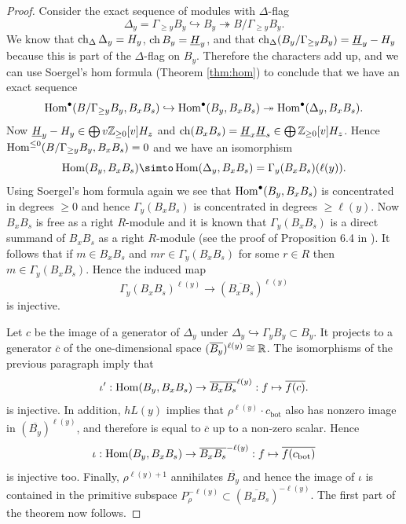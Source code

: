 \documentclass[11pt]{amsart}
\numberwithin{equation}{section}
\def\bot{{\mathrm{bot}}}
\def\ov{\overline}
\def\un{\underline}
\def\to{\rightarrow}
\def\onto{\twoheadrightarrow}
\theoremstyle{definition}
\theoremstyle{remark}
\newcommand{\into}{\hookrightarrow}
\DeclareMathOperator{\Gr}{Gr}
\begin{document}
\begin{proof}
Consider the exact sequence of modules with $\Delta$-flag \[ \Delta_y = \Gamma_{\ge y} B_y \into B_y \onto B/\Gamma_{\ge y} B_y. \] We know that $\operatorname{ch}_\Delta \Delta_y = H_y$,
$\ch B_y = \un{H}_y$, and that $\ch_\Delta (B_y/\Gamma_{\ge y} B_y) =
\un{H}_y - H_y$ because this is part of the $\Delta$-flag on
$B_y$. Therefore the characters add up, and we can use Soergel's hom
formula (Theorem \ref{thm:hom}) to conclude that we have an exact sequence \[ \Hom^\bullet(B/\Gamma_{\ge y}B_y,
B_xB_s) \into \Hom^\bullet(B_y, B_xB_s) \onto \Hom^\bullet(\Delta_y, B_xB_s). \] Now $\un{H}_y - H_y \in \bigoplus v\ZM_{\ge 0}[v] H_z$ and $\ch(B_xB_s) =
\un{H}_x \un{H}_s \in \bigoplus \ZM_{\ge 0}[v] H_z$. Hence $\operatorname{Hom}^{\le 0}(B/\Gamma_{\ge y}B_y, B_xB_s) = 0$ and we have an isomorphism \[ \Hom(B_y, B_xB_s) \simto \Hom(\Delta_y,
B_xB_s) = \Gamma_y(B_xB_s)(\ell(y)). \]
Using Soergel's hom formula again we see that
$\operatorname{Hom}^\bullet(B_y,B_xB_s)$ is concentrated in degrees $\ge 0$ and
hence $\Gamma_y(B_xB_s)$ is concentrated in degrees 
$\ge \ell(y)$.
Now $B_xB_s$ is free as a right $R$-module and it is
known that $\Gamma_y(B_xB_s)$ is a direct 
summand of $B_xB_s$ as a right $R$-module (see the proof of
Proposition 6.4 in \cite{S3}). It follows that if $m \in B_xB_s$ and
$mr \in \Gamma_y(B_xB_s)$ for some $r \in R$ then $m \in
\Gamma_y(B_xB_s)$.
Hence the induced map
\[
\Gamma_y(B_xB_s)^{\ell(y)} \to (\overline{B_xB_s})^{\ell(y)}
\]
is injective.

Let $c$ be the image of a generator of $\Delta_y$ under $\Delta_y
\into \Gamma_y B_y \subset B_y$. It projects to a generator $\ov{c}$ of the
one-dimensional space $(\overline{B_y})^{\ell(y)} \cong {\mathbb{R}}$. 
The isomorphisms of the previous paragraph imply that \[ \iota' : \Hom(B_y, B_xB_s) \to
\ov{B_xB_s}^{\ell(y)} : f \mapsto \ov{f(c)}. \] is injective. In
addition, $hL(y)$ implies that $\rho^{\ell(y)} \cdot c_\bot$ also has nonzero image in
$(\ov{B_y})^{\ell(y)}$, and therefore is equal to $\ov{c}$ up to a non-zero scalar. Hence \[ \iota : \Hom(B_y, B_xB_s) \to \ov{B_xB_s}^{-\ell(y)} : f \mapsto \ov{f(c_\bot)}
\] is injective too. Finally, $\rho^{\ell(y) + 1}$ annihilates $\ov{B_y}$ and hence the image of $\iota$ is contained in the primitive subspace $P^{-\ell(y)}_\rho \subset
(\ov{B_xB_s})^{-\ell(y)}$. The first part of the theorem now follows.


\end{proof}
\end{document}

